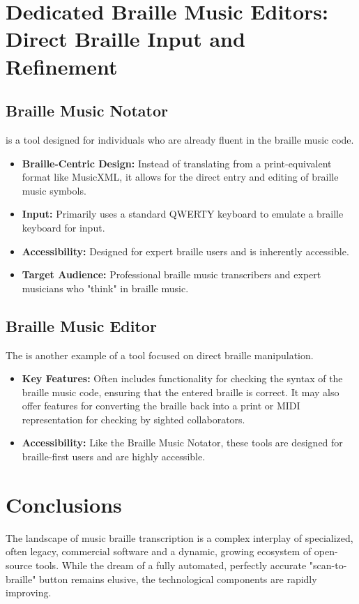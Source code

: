 \section{Dedicated Braille Music Editors: Direct Braille Input and Refinement}\label{ch10:sec:dedicated-editors}

\subsection{Braille Music Notator}\label{ch10:ssec:braille-music-notator}
 is a tool designed for individuals who are already fluent in the braille music code.
\begin{itemize}
	\item \textbf{Braille-Centric Design:} Instead of translating from a print-equivalent format like \gls{MusicXML}, it allows for the direct entry and editing of braille music symbols.
	\item \textbf{Input:} Primarily uses a standard QWERTY keyboard to emulate a braille keyboard for input.
	\item \textbf{Accessibility:} Designed for expert braille users and is inherently accessible.
	\item \textbf{Target Audience:} Professional braille music transcribers and expert musicians who "think" in braille music.
\end{itemize}

\subsection{Braille Music Editor}\label{ch10:ssec:braille-music-editor}
The  is another example of a tool focused on direct braille manipulation.
\begin{itemize}
	\item \textbf{Key Features:} Often includes functionality for checking the syntax of the braille music code, ensuring that the entered braille is correct. It may also offer features for converting the braille back into a print or MIDI representation for checking by sighted collaborators.
	\item \textbf{Accessibility:} Like the Braille Music Notator, these tools are designed for braille-first users and are highly accessible.
\end{itemize}

\section{Conclusions}\label{ch10:sec:conclusions}
The landscape of music braille transcription is a complex interplay of specialized, often legacy, commercial software and a dynamic, growing ecosystem of open-source tools. While the dream of a fully automated, perfectly accurate "scan-to-braille" button remains elusive, the technological components are rapidly improving.


